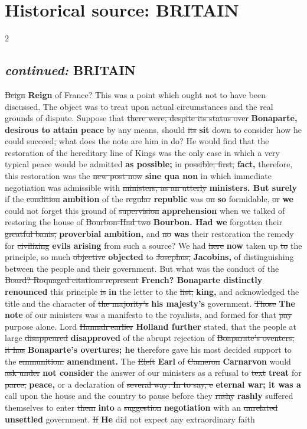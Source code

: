 \documentclass[10pt]{article}
\begin{document}
\section*{Historical source: BRITAIN}
\begin{multicols}{2}
\subsection*{\textit{continued:} BRITAIN}
\sout{Beign} \textbf{Reign} of France? This was a point which ought not to have been discussed. The object was to treat upon actual circumstances and the real grounds of dispute. Suppose that \sout{there were, despite its status over} \textbf{Bonaparte, desirous to attain peace} by any means, should \sout{its} \textbf{sit} down to consider how he could succeed; what does the note are him in do? He would find that the restoration of the hereditary line of Kings was the only case in which a very typical peace would be admitted \textbf{as possible;} in \sout{possible; first,} \textbf{fact,} therefore, this restoration was the \sout{new post now} \textbf{sine qua non} in which immediate negotiation was admissible with \sout{ministers, as an utterly} \textbf{ministers. But surely} if the \sout{condition} \textbf{ambition} of the \sout{regular} \textbf{republic} was \sout{on} \textbf{so} formidable, \sout{or} \textbf{we} could not forget this ground of \sout{supervision} \textbf{apprehension} when we talked of restoring the house of \sout{Bourbon-Had two} \textbf{Bourbon. Had we} forgotten their \sout{greatful banis,} \textbf{proverbial ambition,} and \sout{no} \textbf{was} their restoration the remedy for \sout{civilizing} \textbf{evils arising} from such a source? We had \sout{here} \textbf{now} taken up \sout{to} the principle, so much \sout{objective} \textbf{objected} to \sout{Josephus,} \textbf{Jacobins,} of distinguishing between the people and their government. But what was the conduct of the \sout{Board? Roquaged citations represent} \textbf{French? Bonaparte distinctly renounced} this principle \sout{is} \textbf{in} the letter to the \sout{list,} \textbf{king,} and acknowledged the title and the character of \sout{the majority’s} \textbf{his majesty's} government. \sout{Those} \textbf{The note} of our ministers was a manifesto to the royalists, and formed for that \sout{pay} purpose alone. Lord \sout{Hannah earlier} \textbf{Holland further} stated, that the people at large \sout{disappeared} \textbf{disapproved} of the abrupt rejection of \sout{Boaparate's oventers, it has} \textbf{Bonaparte's overtures; he} therefore gave his most decided support to the \sout{emmunition.} \textbf{amendment.} The \sout{Eleft} \textbf{Earl} of \sout{Cameron} \textbf{Carnarvon} would \sout{ask under} \textbf{not consider} the answer of our ministers as a refusal to \sout{text} \textbf{treat} for \sout{parce,} \textbf{peace,} or a declaration of \sout{several way: In to say, e} \textbf{eternal war; it was a} call upon the house and the country to pause before they \sout{rashy} \textbf{rashly} suffered themselves to enter \sout{them} \textbf{into} a \sout{suggestion} \textbf{negotiation} with an \sout{unrelated} \textbf{unsettled} government. \sout{If} \textbf{He} did not expect any extraordinary faith 
\end{multicols}
\end{document}
